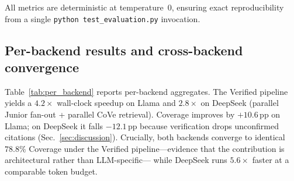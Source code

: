 \documentclass{article}
\begin{document}
All metrics are deterministic at temperature~0, ensuring exact
reproducibility from a single \texttt{python test\_evaluation.py}
invocation.

\subsection{Per-backend results and cross-backend convergence}
\label{sec:perbe}
Table~\ref{tab:per_backend} reports per-backend aggregates. The
Verified pipeline yields a $4.2\times$ wall-clock speedup on Llama
and $2.8\times$ on DeepSeek (parallel Junior fan-out + parallel CoVe
retrieval). Coverage improves by $+10.6$\,pp on Llama; on DeepSeek
it falls $-12.1$\,pp because verification drops unconfirmed citations
(Sec.~\ref{sec:discussion}). Crucially, both backends converge to
identical $78.8\%$ Coverage under the Verified pipeline---evidence
that the contribution is architectural rather than LLM-specific---
while DeepSeek runs $5.6\times$ faster at a comparable token budget.
\end{document}
